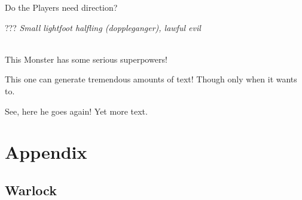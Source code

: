 \documentclass[10pt,twoside,twocolumn,openany]{book}
\begin{document}
\begin{paperbox}{Do the Players need direction?}
	\lipsum[1]
\end{paperbox}

\begin{monsterbox}{???}
	\textit{Small lightfoot halfling (doppleganger), lawful evil}\\
	\hline
	\basics[%
	armorclass = 13,
	hitpoints  = 13,
	speed      = 20 ft
	]
	\hline
	\stats[
	STR = \stat{12}, %
	DEX = \stat{14},
	CON = \stat{10},
	INT = \stat{13},
	WIS = \stat{12},
	CHA = \stat{20}
	]
	\hline
	\details[%
	senses = {Darkvision 60 ft},
	languages = {Common, Erlang},
	conditionimmunities = {Charmed},
	]
	\hline \\[1mm]
	\begin{monsteraction}
		This Monster has some serious superpowers!
	\end{monsteraction}
	\begin{monsteraction}
		This one can generate tremendous amounts of text! Though only when it wants to.
	\end{monsteraction}

	\begin{monsteraction}
	See, here he goes again! Yet more text.
	\end{monsteraction}
\end{monsterbox}

\clearpage

\chapter{Appendix}



\section{Warlock}


\end{document}
